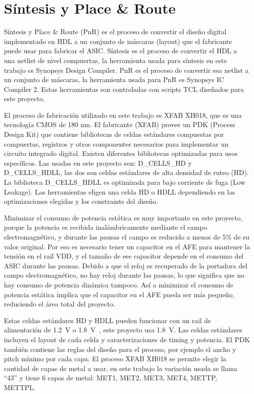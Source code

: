 \documentclass[a4paper, twoside, 11pt]{report}
\begin{document}
\FloatBarrier
\chapter{Síntesis y Place \& Route}

Síntesis y Place \& Route (PnR) es el proceso de convertir el diseño digital implementado en HDL a un conjunto de máscaras (layout) que el fabricante puede usar para fabricar el ASIC. Síntesis es el proceso de convertir el HDL a una netlist de nivel compuertas, la herramienta usada para síntesis en este trabajo es Synopsys Design Compiler. PnR es el proceso de convertir esa netlist a un conjunto de máscaras, la herramienta usada para PnR es Synopsys IC Compiler 2. Estas herramientas son controladas con scripts TCL diseñados para este proyecto.

El proceso de fabricación utilizado en este trabajo es XFAB XH018, que es una tecnología CMOS de 180 nm. El fabricante (XFAB) provee un PDK (Process Design Kit) que contiene bibliotecas de celdas estándares compuestas por compuertas, registros y otros componentes necesarios para implementar un circuito integrado digital. Existen diferentes bibliotecas optimizadas para usos específicos. Las usadas en este proyecto son: D\_CELLS\_HD y D\_CELLS\_HDLL, las dos son celdas estándares de alta densidad de ruteo (HD). La biblioteca D\_CELLS\_HDLL es optimizada para bajo corriente de fuga (Low Leakage). Las herramientas eligen una celda HD o HDLL dependiendo en las optimizaciones elegidas y los constraints del diseño.

Minimizar el consumo de potencia estática es muy importante en este proyecto, porque la potencia es recibida inalámbricamente mediante el campo electromagnético, y durante las pausas el campo es reducido a menos de 5\% de su valor original. Por eso es necesario tener un capacitor en el AFE para mantener la tensión en el rail VDD, y el tamaño de ese capacitor depende en el consumo del ASIC durante las pausas. Debido a que el reloj es recuperado de la portadora del campo electromagnético, no hay reloj durante las pausas, lo que significa que no hay consumo de potencia dinámica tampoco. Así a minimizar el consumo de potencia estática implica que el capacitor en el AFE pueda ser más pequeño, reduciendo el área total del proyecto.

Estas celdas estándares HD y HDLL pueden funcionar con un rail de alimentación de \SI{1.2}{\volt} o \SI{1.8}{\volt}~\cite{xfab_dig_libs_overview}, este proyecto usa \SI{1.8}{\volt}. Las celdas estándares incluyen el layout de cada celda y caracterizaciones de timing y potencia. El PDK también contiene las reglas del diseño para el proceso, por ejemplo el ancho y pitch mínimo por cada capa. El proceso XFAB XH018 se permite elegir la cantidad de capas de metal a usar, en este trabajo la variación usada se llama “43” y tiene 6 capas de metal: MET1, MET2, MET3, MET4, METTP, METTPL.
\end{document}
